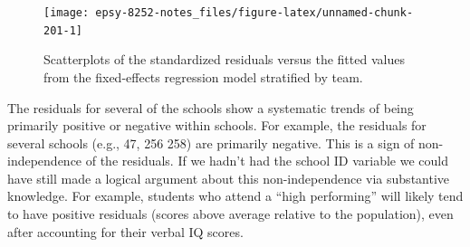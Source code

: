 \documentclass[]{book}
\newenvironment{Shaded}{\begin{snugshade}}{\end{snugshade}}
\newcommand{\CommentTok}[1]{\textcolor[rgb]{0.56,0.35,0.01}{\textit{#1}}}
\newcommand{\DataTypeTok}[1]{\textcolor[rgb]{0.13,0.29,0.53}{#1}}
\newcommand{\DecValTok}[1]{\textcolor[rgb]{0.00,0.00,0.81}{#1}}
\newcommand{\KeywordTok}[1]{\textcolor[rgb]{0.13,0.29,0.53}{\textbf{#1}}}
\newcommand{\NormalTok}[1]{#1}
\newcommand{\OperatorTok}[1]{\textcolor[rgb]{0.81,0.36,0.00}{\textbf{#1}}}
\newcommand{\OtherTok}[1]{\textcolor[rgb]{0.56,0.35,0.01}{#1}}
\newcommand{\StringTok}[1]{\textcolor[rgb]{0.31,0.60,0.02}{#1}}
\begin{document}
\begin{Shaded}
\end{Shaded}

\begin{figure}

{\centering \texttt{[image: epsy-8252-notes\_files/figure-latex/unnamed-chunk-201-1]} 

}

\caption{Scatterplots of the standardized residuals versus the fitted values from the fixed-effects regression model stratified by team.}\label{fig:unnamed-chunk-201}
\end{figure}

The residuals for several of the schools show a systematic trends of being primarily positive or negative within schools. For example, the residuals for several schools (e.g., 47, 256 258) are primarily negative. This is a sign of non-independence of the residuals. If we hadn't had the school ID variable we could have still made a logical argument about this non-independence via substantive knowledge. For example, students who attend a ``high performing'' will likely tend to have positive residuals (scores above average relative to the population), even after accounting for their verbal IQ scores.
\end{document}
